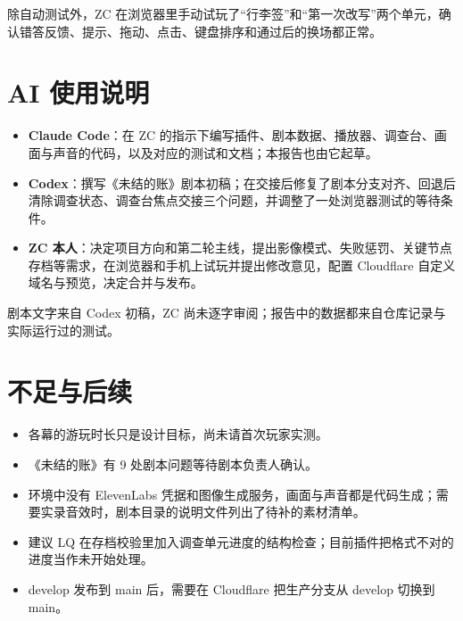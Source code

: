 \documentclass[11pt,a4paper,fontset=mac]{ctexart}
\begin{document}
除自动测试外，ZC 在浏览器里手动试玩了“行李签”和“第一次改写”两个单元，确认错答反馈、提示、拖动、点击、键盘排序和通过后的换场都正常。

\section{AI 使用说明}

\begin{itemize}
  \item \textbf{Claude Code}：在 ZC 的指示下编写插件、剧本数据、播放器、调查台、画面与声音的代码，以及对应的测试和文档；本报告也由它起草。
  \item \textbf{Codex}：撰写《未结的账》剧本初稿；在交接后修复了剧本分支对齐、回退后清除调查状态、调查台焦点交接三个问题，并调整了一处浏览器测试的等待条件。
  \item \textbf{ZC 本人}：决定项目方向和第二轮主线，提出影像模式、失败惩罚、关键节点存档等需求，在浏览器和手机上试玩并提出修改意见，配置 Cloudflare 自定义域名与预览，决定合并与发布。
\end{itemize}

剧本文字来自 Codex 初稿，ZC 尚未逐字审阅；报告中的数据都来自仓库记录与实际运行过的测试。

\section{不足与后续}

\begin{itemize}
  \item 各幕的游玩时长只是设计目标，尚未请首次玩家实测。
  \item 《未结的账》有 9 处剧本问题等待剧本负责人确认。
  \item 环境中没有 ElevenLabs 凭据和图像生成服务，画面与声音都是代码生成；需要实录音效时，剧本目录的说明文件列出了待补的素材清单。
  \item 建议 LQ 在存档校验里加入调查单元进度的结构检查；目前插件把格式不对的进度当作未开始处理。
  \item develop 发布到 main 后，需要在 Cloudflare 把生产分支从 develop 切换到 main。
\end{itemize}
\end{document}
